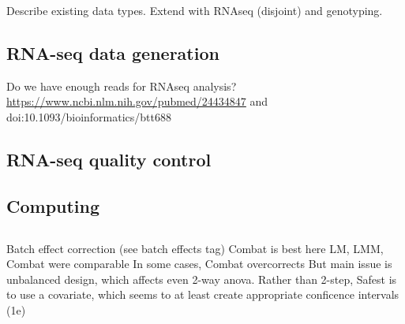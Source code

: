 Describe existing data types.
Extend with RNAseq (disjoint) and genotyping.

\subsection{RNA-seq data generation}

Do we have enough reads for RNAseq analysis? \url{https://www.ncbi.nlm.nih.gov/pubmed/24434847} and doi:10.1093/bioinformatics/btt688

\subsection{RNA-seq quality control}

\subsection{Computing }

\subsection{}

Batch effect correction (see batch effects tag)
Combat is best here
LM, LMM, Combat were comparable
In some cases, Combat overcorrects
But main issue is unbalanced design, which affects even 2-way anova. Rather than 2-step, Safest is to use a covariate, which seems to at least create appropriate conficence intervals (1e)


